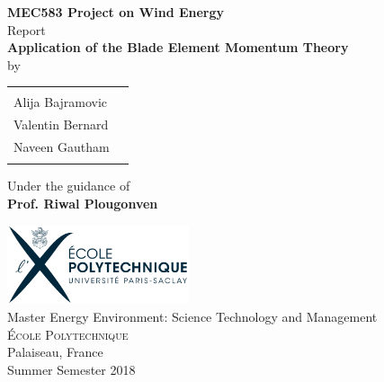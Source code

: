 \begin{titlepage}

\begin{center}

\textup{\small {\bf MEC583 Project on Wind Energy} \\ Report}\\[0.2in]

\Large \textbf {Application of the Blade Element Momentum Theory}\\[0.5in]

\normalsize by \\
\begin{table}[h]
\centering
\begin{tabular}{lr}\hline \\
Alija Bajramovic \\
Valentin Bernard \\ 
Naveen Gautham \\ \\ \hline 
\end{tabular}
\end{table}

\vspace{.1in}
Under the guidance of\\
{\textbf{Prof. Riwal Plougonven}}\\[0.2in]

\vfill

\includegraphics[width=0.4\textwidth]{./Polytechnique_logo_2013_banniere.png}\\[0.2cm]
\Large{Master Energy Environment: Science Technology and Management}\\
\normalsize
\textsc{École Polytechnique}\\
Palaiseau, France \\
\vspace{0.2cm}
Summer Semester 2018

\end{center}

\end{titlepage}
